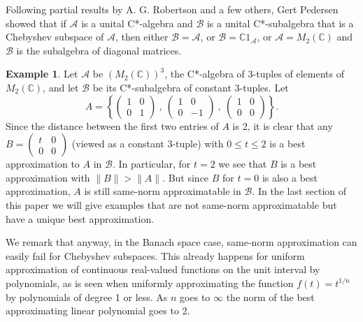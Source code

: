 \documentclass[12pt]{amsart}
\newcommand{\<}{\langle}
\renewcommand{\>}{\rangle}
\newcommand{\cA}{{\mathcal A}}
\newcommand{\cB}{{\mathcal B}}
\newcommand{\bC}{{\mathbb C}}
\theoremstyle{definition}   %
\newtheorem{example}[theorem]{Example}
\begin{document}
Following partial results by A. G. Robertson \cite{Rbt, RbY} and a few others, Gert
Pedersen showed \cite{Pd2} that if $\cA$ is a unital C*-algebra
and $\cB$ is a unital C*-subalgebra that is a Chebyshev subspace
of $\cA$, then either $\cB = \cA$, or $\cB = \bC 1_\cA$, or 
$\cA = M_2(\bC)$ and $\cB$ is the subalgebra of diagonal
matrices.

\begin{example}
\label{non-unique}
Let $\cA$ be $(M_2(\bC))^3$, the C*-algebra of 3-tuples
of elements of $M_2(\bC)$, 
and let $\cB$ be its C*-subalgebra of constant 3-tuples. Let
\[
A = \left\{ \begin{pmatrix}  1 & 0 \\
                                          0 & 1       \end{pmatrix}     \ , \ 
               \begin{pmatrix}  1 & 0  \\
                                         0 & -1             \end{pmatrix}     \ , \
              \begin{pmatrix}   1 & 0  \\                                              
                                         0 & 0             \end{pmatrix}     
     \right\}  .         
\]     
Since the distance between the first two entries of $A$ is 2, it is
clear that any $B =   \begin{pmatrix}   t & 0  \\                                              
                                                                 0 & 0             \end{pmatrix}    
$   
(viewed as a constant 3-tuple) with $0 \leq t \leq 2$ is a best   
approximation to $A$ in $\cB$. In particular, for $t=2$ we see that
$B$ is a best approximation with $\|B\| > \|A\|$. But since $B$ for
$t=0$ is also a best approximation, $A$ is still same-norm
approximatable in $\cB$. In the last section of this
paper we will give examples
that are not same-norm approximatable but have a unique
best approximation.
\end{example}

We remark that anyway, in the Banach space case, same-norm
approximation can easily fail for Chebyshev subspaces. This
already happens for uniform approximation of continuous
real-valued functions on the unit interval by polynomials, as is 
seen when uniformly approximating the function $f(t) = t^{1/n}$ by polynomials
of degree 1 or less. As $n$ goes to $\infty$ the norm of the best approximating
linear polynomial goes to 2. 
\end{document}
